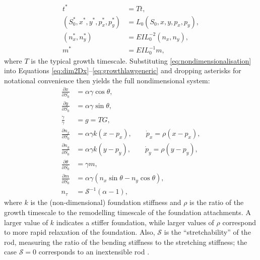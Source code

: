 \begin{align}
t^* &= T t,\nonumber\\
(S_0^*, x^*, y^*, p_x^*, p_y^*) &= L_0(S_0, x, y, p_x, p_y),\nonumber\\
(n_x^*, n_y^*) &= EIL_0^{-2}(n_x, n_y),\nonumber\\
m^* &= EIL_0^{-1}m,\label{eq:nondimensionalisation}
\end{align}
%
where $T$ is the typical growth timescale. Substituting \eqref{eq:nondimensionalisation} into Equations \eqref{eq:dim2Dx}--\eqref{eq:growthlawgeneric} and dropping asterisks for notational convenience then yields the full nondimensional system:
\begin{align}
\frac{\partial x}{\partial S_0} &= \alpha\gamma\cos\theta,\label{eq:lagrangian2Dx}\\
\frac{\partial y}{\partial S_0} &= \alpha\gamma\sin\theta,\label{eq:lagrangian2Dy}\\
\frac{\dot\gamma}{\gamma} &=g= TG,\\
\frac{\partial n_x}{\partial S_0} &=\alpha\gamma k(x - p_x), \qquad \dot{p}_x= \rho(x - p_x),\label{eq:lagrangian2Dforcex}\\
\frac{\partial n_y}{\partial S_0} &= \alpha\gamma k(y - p_y), \qquad \dot{p}_y = \rho(y - p_y),\label{eq:lagrangian2Dforcey}\\
\frac{\partial \theta}{\partial S_0} &= \gamma m,\label{eq:lagrangian2Dtheta}\\
\frac{\partial m}{\partial S_0} &= \alpha\gamma(n_x\sin\theta - n_y\cos\theta),\label{eq:lagrangian2Dmoment}\\
n_\tau& = \mathcal{S}^{-1}(\alpha - 1),\label{eq:lagrangianelasticstretch}
\end{align}
where $k$ is the (non-dimensional) foundation stiffness and $\rho$ is the ratio of the growth timescale to the remodelling timescale of the foundation attachments. A larger value of $k$ indicates a stiffer foundation, while larger values of $\rho$ correspond to more rapid relaxation of the foundation. Also, $\mathcal{S}$ is the ``stretchability'' of the rod, measuring the ratio of the bending stiffness to the stretching stiffness; the case $\mathcal{S} = 0$ corresponds to an inextensible rod \cite{pandey2014dynamics}. %


